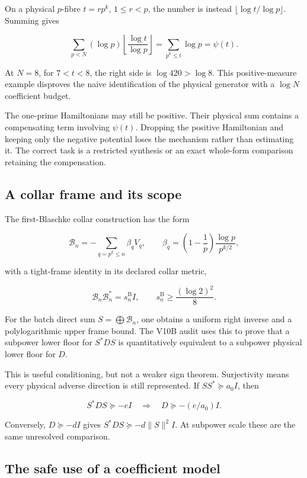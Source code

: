 \documentclass[
  10pt,
  a4paper,
  10pt,
  oneside,
  openany]{book}
\begin{document}
On a physical \(p\)-fibre \(t=rp^k\), \(1\le r<p\), the number is
instead \(\lfloor\log t/\log p\rfloor\). Summing gives

\[
\sum_{p<N}(\log p)\left\lfloor\frac{\log t}{\log p}\right\rfloor
=\sum_{p^k\le t}\log p=\psi(t).
\tag{9.8}\label{eq:9.8}
\]

At \(N=8\), for \(7<t<8\), the right side is \(\log420>\log8\). This
positive-measure example disproves the naive identification of the
physical generator with a \(\log N\) coefficient budget.

The one-prime Hamiltonians may still be positive. Their physical sum
contains a compensating term involving \(\psi(t)\). Dropping the
positive Hamiltonian and keeping only the negative potential loses the
mechanism rather than estimating it. The correct task is a restricted
synthesis or an exact whole-form comparison retaining the compensation.

\subsection{A collar frame and its
scope}\label{a-collar-frame-and-its-scope}

The first-Blaschke collar construction has the form

\[
\mathcal B_n=-\sum_{q=p^k\le n}\beta_qV_q,
\qquad
\beta_q=\left(1-\frac1p\right)\frac{\log p}{p^{k/2}},
\tag{9.9}\label{eq:9.9}
\]

with a tight-frame identity in its declared collar metric,

\[
\mathcal B_n\mathcal B_n^*=s_n^{\mathrm B}I,
\qquad s_n^{\mathrm B}\ge\frac{(\log2)^2}{8}.
\tag{9.10}\label{eq:9.10}
\]

For the batch direct sum \(S=\bigoplus\mathcal B_n\), one obtains a
uniform right inverse and a polylogarithmic upper frame bound. The V10B
audit uses this to prove that a subpower lower floor for \(S^*DS\) is
quantitatively equivalent to a subpower physical lower floor for \(D\).

This is useful conditioning, but not a weaker sign theorem. Surjectivity
means every physical adverse direction is still represented. If
\(SS^*\succeq a_0I\), then

\[
S^*DS\succeq-eI\quad\Longrightarrow\quad D\succeq-(e/a_0)I.
\tag{9.11}\label{eq:9.11}
\]

Conversely, \(D\succeq-dI\) gives \(S^*DS\succeq-d\|S\|^2I\). At
subpower scale these are the same unresolved comparison.

\subsection{The safe use of a coefficient
model}\label{the-safe-use-of-a-coefficient-model}
\end{document}
